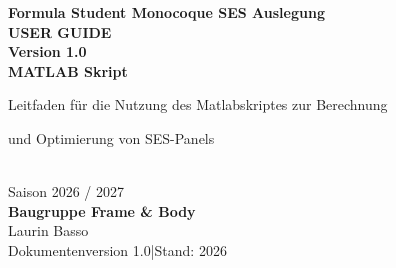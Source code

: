 \documentclass[12pt,oneside]{report}
\newcommand{\DocVersion}{1.0}
\begin{document}
  \hypersetup{pageanchor=false}

  \begin{titlepage}
    \thispagestyle{empty}
    \vspace*{0.8cm}
    \begin{center}
      {\LARGE \textbf{Formula Student Monocoque SES Auslegung}}\\[3.2cm]
    
      {\huge \textbf{USER GUIDE}}\\[0.5cm]
      {\Large \textbf{Version \DocVersion}}\\[2.2cm]
      {\Large \textbf{MATLAB Skript}}\\[2.2cm]
      {\large Leitfaden für die Nutzung des Matlabskriptes zur Berechnung \par und Optimierung von SES-Panels}\\[1.8cm]

      {\large Saison 2026 / 2027}\\[1.5cm]

      \textbf{Baugruppe Frame \& Body}\\[0.4cm]
      Laurin Basso\\[1.5cm]

      \vfill
      {\small Dokumentenversion \DocVersion \quad|\quad Stand: 2026}
    \end{center}
  \end{titlepage}
  \clearpage

  \hypersetup{pageanchor=true}
  \tableofcontents
  \clearpage

  \listoftables
  \clearpage

  
  \clearpage
\end{document}
